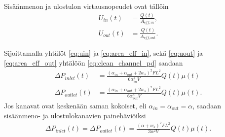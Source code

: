 Sisäänmenon ja ulostulon virtausnopeudet ovat tällöin
\begin{align}
    U_{in}(t) &= \frac{Q(t)}{A_{eff, in}}, \label{eq:uin}\\
    U_{out}(t) &= \frac{Q(t)}{A_{eff, out}}. \label{eq:uout}
\end{align}

Sijoittamalla yhtälöt \eqref{eq:uin} ja \eqref{eq:area_eff_in}, sekä \eqref{eq:uout} ja \eqref{eq:area_eff_out} yhtälöön \eqref{eq:clean_channel_pd} saadaan
\begin{align}
    \Delta P_{inlet}(t) &=  \frac{(\alpha_{in}+\alpha_{out}+2w_s)^2F L^2}{6\alpha_{in}^4V}Q(t) \mu(t) \label{eq:DeltaP_inlet_clean}
    \\ 
    \Delta P_{outlet}(t) &=\frac{(\alpha_{in}+\alpha_{out}+2w_s)^2FL^2}{6\alpha_{out}^4V}Q(t) \mu(t).
\end{align}
Jos kanavat ovat keskenään saman kokoiset, eli  \(\alpha_{in}=\alpha_{out}=\alpha\), saadaan sisäänmeno- ja ulostulokanavien painehäviöiksi 
\begin{align}
     \Delta P_{inlet}(t)= \Delta P_{outlet}(t) =   \frac{(\alpha+w_s)^2F L^2}{3\alpha^2V}Q(t)\mu(t) .
\end{align}


